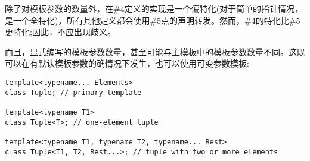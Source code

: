 除了对模板参数的数量外，在\#4定义的实现是一个偏特化(对于简单的指针情况，是一个全特化)，所有其他定义都会使用\#5点的声明转发。然而，\#4的特化比\#5更特化;因此，不应出现歧义。

而且，显式编写的模板参数数量，甚至可能与主模板中的模板参数数量不同。这既可以在有默认模板参数的确情况下发生，也可以使用可变参数模板:

\begin{lstlisting}[style=styleCXX]
template<typename... Elements>
class Tuple; // primary template

template<typename T1>
class Tuple<T>; // one-element tuple

template<typename T1, typename T2, typename... Rest>
class Tuple<T1, T2, Rest...>; // tuple with two or more elements
\end{lstlisting}


















